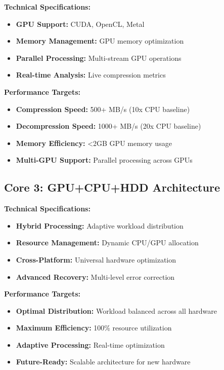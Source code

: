 \documentclass[12pt,a4paper]{article}
\begin{document}
\textbf{Technical Specifications:}
\begin{itemize}
    \item \textbf{GPU Support:} CUDA, OpenCL, Metal
    \item \textbf{Memory Management:} GPU memory optimization
    \item \textbf{Parallel Processing:} Multi-stream GPU operations
    \item \textbf{Real-time Analysis:} Live compression metrics
\end{itemize}

\textbf{Performance Targets:}
\begin{itemize}
    \item \textbf{Compression Speed:} 500+ MB/s (10x CPU baseline)
    \item \textbf{Decompression Speed:} 1000+ MB/s (20x CPU baseline)
    \item \textbf{Memory Efficiency:} <2GB GPU memory usage
    \item \textbf{Multi-GPU Support:} Parallel processing across GPUs
\end{itemize}

\subsection{Core 3: GPU+CPU+HDD Architecture}

\textbf{Technical Specifications:}
\begin{itemize}
    \item \textbf{Hybrid Processing:} Adaptive workload distribution
    \item \textbf{Resource Management:} Dynamic CPU/GPU allocation
    \item \textbf{Cross-Platform:} Universal hardware optimization
    \item \textbf{Advanced Recovery:} Multi-level error correction
\end{itemize}

\textbf{Performance Targets:}
\begin{itemize}
    \item \textbf{Optimal Distribution:} Workload balanced across all hardware
    \item \textbf{Maximum Efficiency:} 100\% resource utilization
    \item \textbf{Adaptive Processing:} Real-time optimization
    \item \textbf{Future-Ready:} Scalable architecture for new hardware
\end{itemize}
\end{document}
